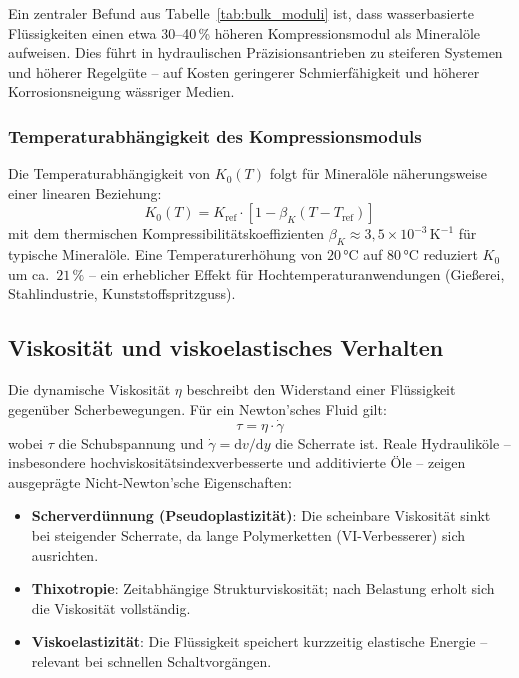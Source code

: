 ﻿\documentclass[a4paper,12pt]{scrreprt}
\theoremstyle{definition}
\begin{document}
Ein zentraler Befund aus Tabelle~\ref{tab:bulk_moduli} ist, dass wasserbasierte
Flüssigkeiten einen etwa 30--40\,\% höheren Kompressionsmodul als Mineralöle
aufweisen. Dies führt in hydraulischen Präzisionsantrieben zu steiferen Systemen
und höherer Regelgüte -- auf Kosten geringerer Schmierfähigkeit und höherer
Korrosionsneigung wässriger Medien.

\subsubsection{Temperaturabhängigkeit des Kompressionsmoduls}

Die Temperaturabhängigkeit von $K_0(T)$ folgt für Mineralöle näherungsweise
einer linearen Beziehung:
\begin{equation}
  K_0(T) = K_{\mathrm{ref}} \cdot \left[1 - \beta_K (T - T_{\mathrm{ref}})\right]
  \label{eq:bulk_temp}
\end{equation}
mit dem thermischen Kompressibilitätskoeffizienten
$\beta_K \approx 3{,}5 \times 10^{-3}\,\mathrm{K}^{-1}$ für typische
Mineralöle. Eine Temperaturerhöhung von $20\, °\mathrm{C}$ auf $80\, °\mathrm{C}$
reduziert $K_0$ um ca.\ $21\,\%$ -- ein erheblicher Effekt für
Hochtemperaturanwendungen (Gießerei, Stahlindustrie, Kunststoffspritzguss).

\subsection{Viskosität und viskoelastisches Verhalten}

Die dynamische Viskosität $\eta$ beschreibt den Widerstand einer Flüssigkeit
gegenüber Scherbewegungen. Für ein Newton'sches Fluid gilt:
\begin{equation}
  \tau = \eta \cdot \dot{\gamma}
  \label{eq:newton_viskos}
\end{equation}
wobei $\tau$ die Schubspannung und $\dot{\gamma} = \mathrm{d}v/\mathrm{d}y$
die Scherrate ist. Reale Hydrauliköle -- insbesondere hochviskositätsindexverbesserte
und additivierte Öle -- zeigen ausgeprägte Nicht-Newton'sche Eigenschaften:

\begin{itemize}
  \item \textbf{Scherverdünnung (Pseudoplastizität)}: Die scheinbare Viskosität
    sinkt bei steigender Scherrate, da lange Polymerketten (VI-Verbesserer)
    sich ausrichten.
  \item \textbf{Thixotropie}: Zeitabhängige Strukturviskosität; nach Belastung
    erholt sich die Viskosität vollständig.
  \item \textbf{Viskoelastizität}: Die Flüssigkeit speichert kurzzeitig
    elastische Energie -- relevant bei schnellen Schaltvorgängen.
\end{itemize}
\end{document}
